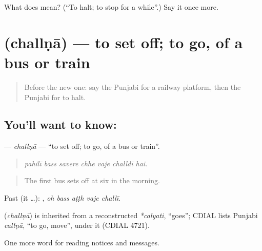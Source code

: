 \begin{tcolorbox}[breakable,colback=teal!4,colframe=teal!35!black,title={Before you move on}]
What does  mean? (\textquotedblleft{}To halt; to stop for a while\textquotedblright{}.) Say it once more.
\end{tcolorbox}
\section[\texorpdfstring{\pa{ਚੱਲਣਾ} (challṇā)}{ਚੱਲਣਾ (challṇā)}]{ (challṇā) — to set off; to go, of a bus or train}

\label{lesson:PA-C261-challna}



\begin{quote}
Before the new one: say the Punjabi for a railway platform, then the Punjabi for to halt.
\end{quote}

\subsection*{You'll want to know: }
\textbf{} — \emph{challṇā} — \textquotedblleft{}to set off; to go, of a bus or train\textquotedblright{}.

\begin{quote}
      
\end{quote}

\begin{quote}
\emph{pahilī bass savere chhe vaje challdī hai.}
\end{quote}

\begin{quote}
The first bus sets off at six in the morning.
\end{quote}

Past (it …):     , \emph{oh bass aṭṭh vaje challī}.

\begin{cousinweb}
\textbf{} (\emph{challṇā}) is inherited from a reconstructed \emph{*calyati}, \textquotedblleft{}goes\textquotedblright{}; CDIAL lists Punjabi \emph{callṇā}, \textquotedblleft{}to go, move\textquotedblright{}, under it (CDIAL 4721).
\end{cousinweb}

\begin{grammarlens}[title={What you've built}]
One more word for reading notices and messages.
\end{grammarlens}

